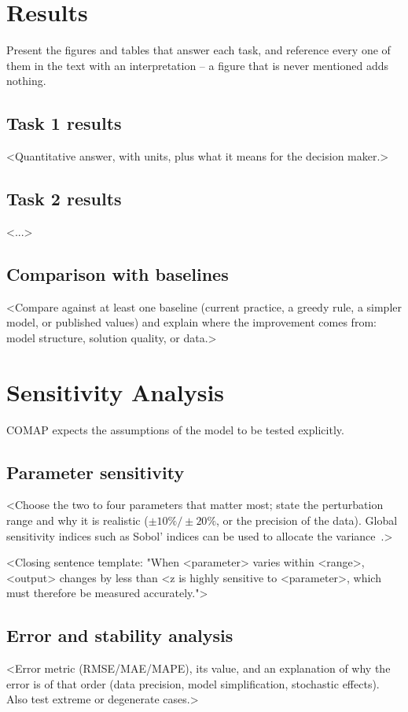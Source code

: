 \documentclass[12pt]{article}
\begin{document}
\section{Results}
Present the figures and tables that answer each task, and reference every one
of them in the text with an interpretation -- a figure that is never mentioned
adds nothing.

\subsection{Task 1 results}
<Quantitative answer, with units, plus what it means for the decision maker.>

\subsection{Task 2 results}
<...>

\subsection{Comparison with baselines}
<Compare against at least one baseline (current practice, a greedy rule, a
simpler model, or published values) and explain where the improvement comes
from: model structure, solution quality, or data.>

\section{Sensitivity Analysis}
COMAP expects the assumptions of the model to be tested explicitly.

\subsection{Parameter sensitivity}
<Choose the two to four parameters that matter most; state the perturbation
range and why it is realistic ($\pm 10\%/\pm 20\%$, or the precision of the
data). Global sensitivity indices such as Sobol' indices can be used to
allocate the variance~\cite{saltelli2008global}.>

<Closing sentence template: "When <parameter> varies within <range>, <output>
changes by less than <z%
is highly sensitive to <parameter>, which must therefore be measured
accurately.">

\subsection{Error and stability analysis}
<Error metric (RMSE/MAE/MAPE), its value, and an explanation of why the error
is of that order (data precision, model simplification, stochastic effects).
Also test extreme or degenerate cases.>
\end{document}
